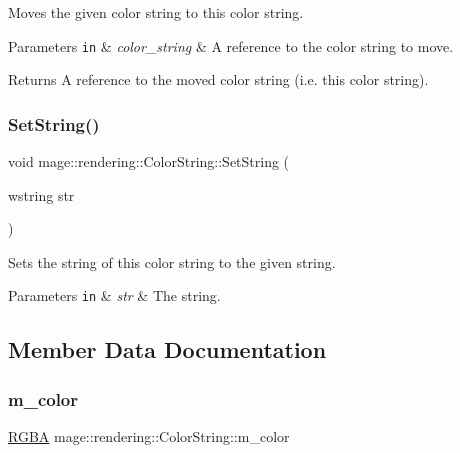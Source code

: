 Moves the given color string to this color string.


\begin{DoxyParams}[1]{Parameters}
\mbox{\tt in}  & {\em color\+\_\+string} & A reference to the color string to move. \\
\hline
\end{DoxyParams}
\begin{DoxyReturn}{Returns}
A reference to the moved color string (i.\+e. this color string). 
\end{DoxyReturn}
\mbox{\label{classmage_1_1rendering_1_1_color_string_aefee43f68f87617976f89430bac71fba}} 
\subsubsection{\texorpdfstring{Set\+String()}{SetString()}}
{\footnotesize\ttfamily void mage\+::rendering\+::\+Color\+String\+::\+Set\+String (\begin{DoxyParamCaption}\item[{wstring}]{str }\end{DoxyParamCaption})\hspace{0.3cm}{\ttfamily [noexcept]}}

Sets the string of this color string to the given string.


\begin{DoxyParams}[1]{Parameters}
\mbox{\tt in}  & {\em str} & The string. \\
\hline
\end{DoxyParams}


\subsection{Member Data Documentation}
\mbox{\label{classmage_1_1rendering_1_1_color_string_a6b062bfa44b3786c5e8f2e8d18a373ca}} 
\subsubsection{\texorpdfstring{m\+\_\+color}{m\_color}}
{\footnotesize\ttfamily \mbox{\hyperlink{structmage_1_1_r_g_b_a}{R\+G\+BA}} mage\+::rendering\+::\+Color\+String\+::m\+\_\+color\hspace{0.3cm}{\ttfamily [private]}}

